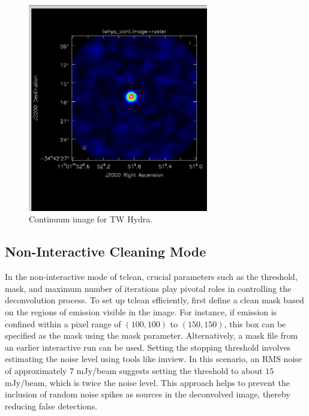 \begin{figure}[H]
       \centering
       \includegraphics[width=0.7\textwidth]{Images/continuum-image.png}
       \caption{Continuum image for TW Hydra.}
\end{figure}

\clearpage

\subsection{Non-Interactive Cleaning Mode}

In the non-interactive mode of tclean, crucial parameters such as the threshold, mask, and maximum number of iterations play pivotal roles in controlling the deconvolution process. To set up tclean efficiently, first define a clean mask based on the regions of emission visible in the image. For instance, if emission is confined within a pixel range of $(100, 100)$ to $(150, 150)$, this box can be specified as the mask using the mask parameter. Alternatively, a mask file from an earlier interactive run can be used. Setting the stopping threshold involves estimating the noise level using tools like imview. In this scenario, an RMS noise of approximately $7$ mJy/beam suggests setting the threshold to about $15$ mJy/beam, which is twice the noise level. This approach helps to prevent the inclusion of random noise spikes as sources in the deconvolved image, thereby reducing false detections. \\

